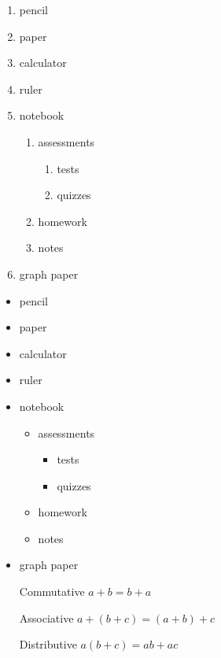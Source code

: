 \documentclass[11pt]{article}
\begin{document}
\begin{enumerate}
\item pencil
\item paper
\item calculator
\item ruler
\item notebook
	\begin{enumerate}
	\item assessments
		\begin{enumerate}
		\item tests
		\item quizzes
		\end{enumerate}
	\item homework
	\item notes
	\end{enumerate}
\item graph paper
\end{enumerate}

\begin{itemize}
\item pencil
\item paper
\item calculator
\item ruler
\item notebook
	\begin{itemize}
	\item assessments
		\begin{itemize}
		\item tests
		\item quizzes
		\end{itemize}
	\item homework
	\item notes
	\end{itemize}
\item graph paper
\end{itemize}

\begin{enumerate}
\item[Commutative] $a+b=b+a$
\item[Associative] $a+(b+c)=(a+b)+c$
\item[Distributive] $a(b+c)=ab+ac$
\end{enumerate}
\end{document}
